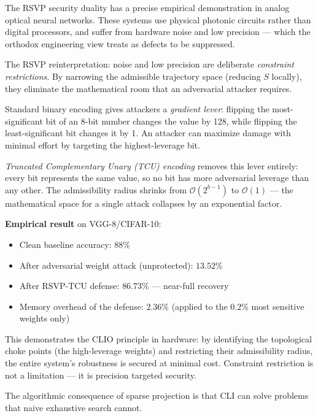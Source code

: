 \begin{example}[title={TCU Encoding: Constraint Restriction as Security}]
  The RSVP security duality has a precise empirical demonstration in
  analog optical neural networks. These systems use physical photonic
  circuits rather than digital processors, and suffer from hardware
  noise and low precision — which the orthodox engineering view treats
  as defects to be suppressed.

  The RSVP reinterpretation: noise and low precision are deliberate
  \emph{constraint restrictions}. By narrowing the admissible trajectory
  space (reducing $S$ locally), they eliminate the mathematical room
  that an adversarial attacker requires.

  Standard binary encoding gives attackers a \emph{gradient lever}:
  flipping the most-significant bit of an 8-bit number changes the value
  by 128, while flipping the least-significant bit changes it by 1.
  An attacker can maximize damage with minimal effort by targeting the
  highest-leverage bit.

  \emph{Truncated Complementary Unary (TCU) encoding} removes this lever
  entirely: every bit represents the same value, so no bit has more
  adversarial leverage than any other. The admissibility radius shrinks
  from $\mathcal{O}(2^{b-1})$ to $\mathcal{O}(1)$ — the mathematical
  space for a single attack collapses by an exponential factor.

  \textbf{Empirical result} on VGG-8/CIFAR-10:
  \begin{itemize}
    \item Clean baseline accuracy: $88\%$
    \item After adversarial weight attack (unprotected): $13.52\%$
    \item After RSVP-TCU defense: $86.73\%$ — near-full recovery
    \item Memory overhead of the defense: $2.36\%$ (applied to the
          $0.2\%$ most sensitive weights only)
  \end{itemize}

  This demonstrates the CLIO principle in hardware: by identifying the
  topological choke points (the high-leverage weights) and restricting
  their admissibility radius, the entire system's robustness is secured
  at minimal cost. Constraint restriction is not a limitation — it is
  precision targeted security.
\end{example}


The algorithmic consequence of sparse projection is that CLI can solve
problems that naive exhaustive search cannot.


